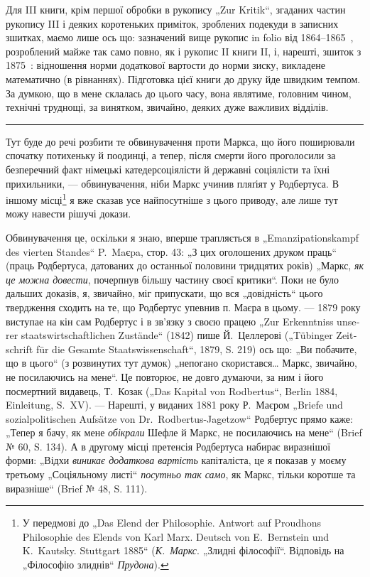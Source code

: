 Для III книги, крім першої обробки в рукопису „Zur Kritik“, згаданих
частин рукопису III і деяких коротеньких приміток, зроблених подекуди
в записних зшитках, маємо лише ось що: зазначений вище рукопис
in folio від 1864--1865~, розроблений майже так само повно, як
і рукопис II книги II, і, нарешті, зшиток з 1875~: відношення норми
додаткової вартости до норми зиску, викладене математично (в рівнаннях).
Підготовка цієї книги до друку йде швидким темпом. За думкою,
що в мене склалась до цього часу, вона являтиме, головним чином, технічні
труднощі, за винятком, звичайно, деяких дуже важливих відділів.

\pfbreak{}

\vspace*{\fill}
Тут буде до речі розбити те обвинувачення проти Маркса, що його
поширювали спочатку потихеньку й поодинці, а тепер, після смерти його
проголосили за безперечний факт німецькі катедерсоціялісти й державні
соціялісти та їхні прихильники, — обвинувачення, ніби Маркс учинив
пляґіят у Родбертуса. В іншому місці\footnote{
У передмові до „Das Elend der Philosophie. Antwort auf Proudhons Philosophie
des Elends von Karl Marx. Deutsch von E.~Bernstein und K.~Kautsky.
Stuttgart 1885“ (\emph{К.~Маркс}. „Злидні філософії“. Відповідь на „Філософію злиднів“
\emph{Прудона}).
} я вже сказав усе найпосутніше
з цього приводу, але лише тут можу навести рішучі докази.

Обвинувачення це, оскільки я знаю, вперше трапляється в „\textgerman{Emanzipationskampf
des vierten Standes}“ P.~Maєpa, стор. 43: „З цих оголошених
друком праць“ (праць Родбертуса, датованих до останньої половини
тридцятих років) „Маркс, \emph{як це можна довести}, почерпнув більшу частину
своєї критики“. Поки не було дальших доказів, я, звичайно, міг
припускати, що вся „довідність“ цього твердження сходить на те, що
Родбертус упевнив п. Маєра в цьому. — 1879 року виступае на кін сам Родбертус
і в зв’язку з своєю працею „\textgerman{Zur Erkenntniss unserer staatswirtschaftlichen
Zustände}“ (1842) пише Й.~Целлерові („\textgerman{Tübinger Zeitschrift für
die Gesamte Staatswissenschaft}“, 1879, S. 219) ось що: „Ви побачите, що
в цього“ (з розвинутих тут думок) „непогано скористався\dots{} Маркс, звичайно,
не посилаючись на мене“. Це повторює, не довго думаючи, за ним
і його посмертний видавець, Т.~Козак („Das Kapital von Rodbertus“, Berlin
1884, Einleitung, S.~XV). — Нарешті, у виданих 1881 року Р.~Маєром
„Briefe und sozialpolitischen Aufsätze von Dr.~Rodbertus-Jagetzow“ Родбертус
прямо каже: „Тепер я бачу, як мене \emph{обікрали} Шефле й Маркс, не
посилаючись на мене“ (Brief № 60, S. 134). А в другому місці претенсія
Родбертуса набирає виразнішої форми: „Відхи \emph{виникає додаткова
вартість} капіталіста, це я показав у моєму третьому „Соціяльному листі“
\emph{посутньо так само}, як Маркс, тільки коротше та виразніше“ (Brief
№ 48, S. 111).

